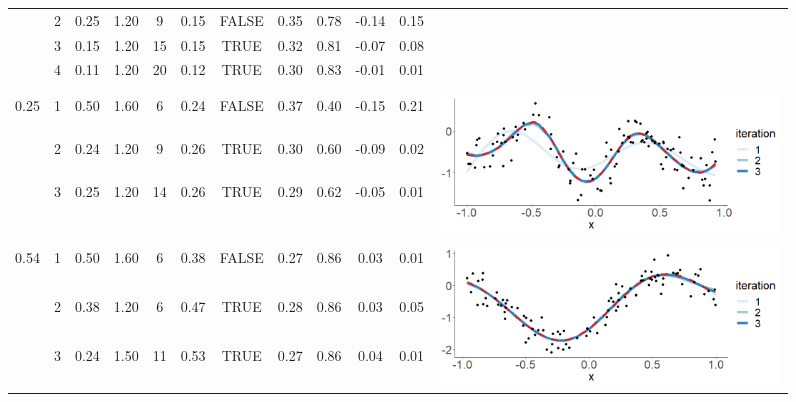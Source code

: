 \begin{figure}
\begin{tabular}{ c c c c c c c c c c | c c}
 & 2 & 0.25 & 1.20 & 9 & 0.15 & FALSE & 0.35 & 0.78 & -0.14 & 0.15 & \\
 & 3 & 0.15 & 1.20 & 15 & 0.15 & TRUE & 0.32 & 0.81 & -0.07 & 0.08 & \\
 & 4 & 0.11 & 1.20 & 20 & 0.12 & TRUE & 0.30 & 0.83 & -0.01 & 0.01 & \\
 \\[1mm]
\arrayrulecolor{lightgray}\hline \\[-1mm]
\multirow{3}{*}{ 0.25} 
 & 1 & 0.50 & 1.60 & 6 & 0.24 & FALSE & 0.37 & 0.40 & -0.15 & 0.21 & \multirow{5}{*}{ \includegraphics[scale=0.20, trim = 0mm 10mm 0mm 5mm, clip]{fig9_diagnostic_4.png}}\\
 & 2 & 0.24 & 1.20 & 9 & 0.26 & TRUE & 0.30 & 0.60 & -0.09 & 0.02 & \\
 & 3 & 0.25 & 1.20 & 14 & 0.26 & TRUE & 0.29 & 0.62 & -0.05 & 0.01 & \\
 \\
 \\[1mm]
\arrayrulecolor{lightgray}\hline \\[-1mm]
\multirow{3}{*}{ 0.54} 
 & 1 & 0.50 & 1.60 & 6 & 0.38 & FALSE & 0.27 & 0.86 & 0.03 & 0.01 & \multirow{5}{*}{ \includegraphics[scale=0.20, trim = 0mm 10mm 0mm 3mm, clip]{fig9_diagnostic_5.png}}\\
 & 2 & 0.38 & 1.20 & 6 & 0.47 & TRUE & 0.28 & 0.86 & 0.03 & 0.05 & \\
 & 3 & 0.24 & 1.50 & 11 & 0.53 & TRUE & 0.27 & 0.86 & 0.04 & 0.01 & \\

\end{tabular}
\end{figure}
